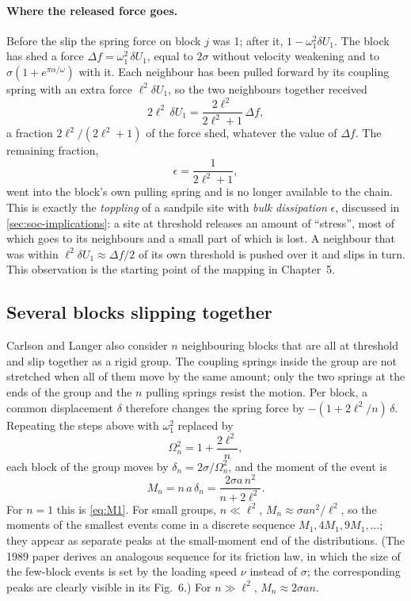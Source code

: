 \paragraph{Where the released force goes.} Before the slip the spring force on block $j$ was 1; after it, $1-\omega_1^2\delta U_1$.
The block has shed a force $\Delta f = \omega_1^2\,\delta U_1$, equal to $2\sigma$ without velocity weakening and to
$\sigma(1+e^{\pi\alpha/\omega})$ with it. Each neighbour has been pulled forward by its coupling spring with an extra
force $\ell^2\delta U_1$, so the two neighbours together received
\begin{equation}
  2\ell^2\,\delta U_1 = \frac{2\ell^2}{2\ell^2+1}\,\Delta f ,
\end{equation}
a fraction $2\ell^2/(2\ell^2+1)$ of the force shed, whatever the value of $\Delta f$. The remaining fraction,
\begin{equation}
  \epsilon = \frac{1}{2\ell^2+1},
  \label{eq:eps-bk}
\end{equation}
went into the block's own pulling spring and is no longer available to the chain. This is exactly the \emph{toppling} of a
sandpile site with \emph{bulk dissipation} $\epsilon$, discussed in \cref{sec:soc-implications}: a site at threshold releases
an amount of ``stress'', most of which goes to its neighbours and a small part of which is lost. A neighbour that was within
$\ell^2\delta U_1\approx\Delta f/2$ of its own threshold is pushed over it and slips in turn. This observation is the starting point
of the mapping in Chapter~5.

\subsection{Several blocks slipping together}

Carlson and Langer also consider $n$ neighbouring blocks that are all at threshold and slip together as a rigid group. The
coupling springs inside the group are not stretched when all of them move by the same amount; only the two springs at the
ends of the group and the $n$ pulling springs resist the motion. Per block, a common displacement $\delta$ therefore changes the
spring force by $-(1 + 2\ell^2/n)\,\delta$. Repeating the steps above with $\omega_1^2$ replaced by
\begin{equation}
  \Omega_n^2 = 1 + \frac{2\ell^2}{n},
\end{equation}
each block of the group moves by $\delta_n = 2\sigma/\Omega_n^2$, and the moment of the event is
\begin{equation}
  M_n = n\,a\,\delta_n = \frac{2\sigma a\,n^2}{n+2\ell^2}.
  \label{eq:Mn}
\end{equation}
For $n=1$ this is \cref{eq:M1}. For small groups, $n\ll\ell^2$, $M_n\approx \sigma a n^2/\ell^2$, so the moments of the smallest
events come in a discrete sequence $M_1, 4M_1, 9M_1,\dots$; they appear as separate peaks at the small-moment end of the
distributions. (The 1989 paper derives an analogous sequence for its friction law, in which the size of the few-block events is set by the
loading speed $\nu$ instead of $\sigma$; the corresponding peaks are clearly visible in its Fig.~6.) For $n\gg\ell^2$, $M_n\approx2\sigma a n$.

